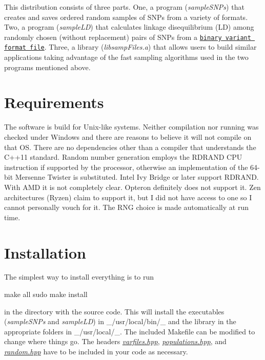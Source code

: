 This distribution consists of three parts. One, a program ({\itshape sample\+S\+N\+Ps}) that creates and saves ordered random samples of S\+N\+Ps from a variety of formats. Two, a program ({\itshape sample\+LD}) that calculates linkage disequilibrium (LD) among randomly chosen (without replacement) pairs of S\+N\+Ps from a \href{http://zzz.bwh.harvard.edu/plink/data.shtml#bed}{\tt binary variant format file}. Three, a library ({\itshape libsamp\+Files.\+a}) that allows users to build similar applications taking advantage of the fast sampling algorithms used in the two programs mentioned above.

\section*{Requirements}

The software is build for Unix-\/like systems. Neither compilation nor running was checked under Windows and there are reasons to believe it will not compile on that OS. There are no dependencies other than a compiler that understands the C++11 standard. Random number generation employs the {\ttfamily R\+D\+R\+A\+ND} C\+PU instruction if supported by the processor, otherwise an implementation of the 64-\/bit Mersenne Twister \cite{matsumoto98a} is substituted. Intel Ivy Bridge or later support {\ttfamily R\+D\+R\+A\+ND}. With A\+MD it is not completely clear. Opteron definitely does not support it. Zen architectures (Ryzen) claim to support it, but I did not have access to one so I cannot personally vouch for it. The R\+NG choice is made automatically at run time.

\section*{Installation}

The simplest way to install everything is to run \begin{DoxyVerb}make all
sudo make install
\end{DoxyVerb}


in the directory with the source code. This will install the executables ({\itshape sample\+S\+N\+Ps} and {\itshape sample\+LD}) in \+\_\+/usr/local/bin/\+\_\+ and the library in the appropriate folders in \+\_\+/usr/local/\+\_\+. The included Makefile can be modified to change where things go. The headers {\itshape \hyperlink{varfiles_8hpp}{varfiles.\+hpp}}, {\itshape \hyperlink{populations_8hpp}{populations.\+hpp}}, and {\itshape \hyperlink{random_8hpp}{random.\+hpp}} have to be included in your code as necessary.

